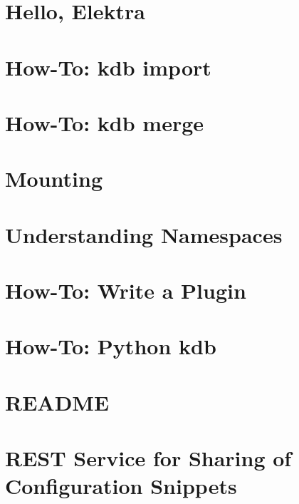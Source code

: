 \documentclass[twoside]{book}
\newcommand{\+}{\discretionary{\mbox{\scriptsize$\hookleftarrow$}}{}{}}
\begin{document}
\chapter{Hello, Elektra}
\label{doc_tutorials_hello-elektra_md}

\chapter{How-\/\+To\+: kdb import}
\label{doc_tutorials_import_md}

\chapter{How-\/\+To\+: kdb merge}
\label{doc_tutorials_merge_md}

\chapter{Mounting}
\label{doc_tutorials_mount_md}

\chapter{Understanding Namespaces}
\label{doc_tutorials_namespaces_md}

\chapter{How-\/\+To\+: Write a Plugin}
\label{doc_tutorials_plugins_md}

\chapter{How-\/\+To\+: Python kdb}
\label{doc_tutorials_python-kdb_md}

\chapter{R\+E\+A\+D\+ME}
\label{md_doc_tutorials_README}

\chapter{R\+E\+ST Service for Sharing of Configuration Snippets}
\label{doc_tutorials_snippet-sharing-rest-service_md}

\end{document}
